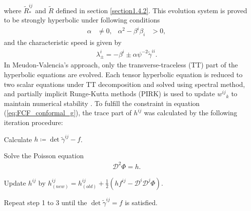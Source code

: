 where $\tilde{R}^{ij}_*$ and $\tilde{R}$ defined in section \ref{section1.4.2}.
This evolution system is proved to be strongly hyperbolic \cite{cordero2008mathematical} under following conditions
\begin{align}
    \alpha &\neq 0, & \alpha^2 - \beta^i \beta_i &> 0,
\end{align}
and the characteristic speed is given by
\begin{align}
    \lambda^i_{\pm} = -\beta^i \pm \alpha\psi^{-2} \tilde{\gamma}^{ii}.
\end{align}
In Meudon-Valencia's approach, only the transverse-traceless (TT) part of the hyperbolic equations are evolved.
Each tensor hyperbolic equation is reduced to two scalar equations under TT decomposition \cite{bonazzola2004constrained} and solved using spectral method,
and partially implicit Runge-Kutta methods (PIRK) is used to update $w^{ij}{}_k$ to maintain numerical stability \cite{cordero2012gravitational,cordero2012partially}.
To fulfill the constraint in equation (\ref{eq:FCF_conformal_g}), the trace part of $h^{ij}$ was calculated by the following iteration procedure:
\begin{Step}
    \item Calculate $h\coloneqq \det{\tilde{\gamma}^{ij}} - f$.
    \item Solve the Poisson equation
    \begin{align}\label{eq:FCF_g_trace}
        \mathcal{D}^2 \Phi = h.
    \end{align}
    \item Update $h^{ij}$ by $h^{ij}_{(new)} = h^{ij}_{(old)} + \frac{1}{2} \left( h f^{ij} - \mathcal{D}^i \mathcal{D}^j \Phi \right)$.
    \item Repeat step 1 to 3 until the $\det{\tilde{\gamma}^{ij}} = f$ is satisfied.
\end{Step}

